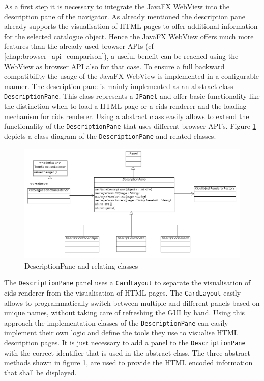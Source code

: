 As a first step it is necessary to integrate the JavaFX WebView into the description pane of the navigator.
As already mentioned the description pane already supports the visualisation of HTML pages to offer additional information for the selected catalogue object. 
Hence the JavaFX WebView offers much more features than the already used browser APIs (cf \ref{chap:browser_api_comparison}), a useful benefit can be reached using the WebView as browser API also for that case. 
To ensure a full backward compatibility the usage of the JavaFX WebView is implemented in a configurable manner. 
The description pane is mainly implemented as an abstract class \texttt{DescriptionPane}. 
This class represents a \texttt{JPanel} and offer basic functionality like the distinction when to load a HTML page or a cids renderer and the loading mechanism for cids renderer. 
Using a abstract class easily allows to extend the functionality of the \texttt{DescriptionPane} that uses different browser API's.  
Figure \ref{fig:class_diag_desc_pane} depicts a class diagram of the \texttt{DescriptionPane} and related classes.

\begin{figure}
	\centering	\includegraphics[width=1.0\textwidth]{./img/classDiagramms/description_pane.png}
	\caption{DescriptionPane and relating classes}
	\label{fig:class_diag_desc_pane}
\end{figure}

The \texttt{DescriptionPane} panel uses a \texttt{CardLayout} to separate the visualisation of cids renderer from the visualisation of HTML pages.
The \texttt{CardLayout} easily allows to programmatically switch between multiple and different panels based on unique names, without taking care of refreshing the GUI by hand.
Using this approach the implementation classes of the \texttt{DescriptionPane} can easily implement their own logic and define the tools they use to visualise HTML description pages.
It is just necessary to add a panel to the \texttt{DescriptionPane} with the correct identifier that is used in the abstract class.
The three abstract methods shown in figure \ref{fig:class_diag_desc_pane}, are used to provide the HTML encoded information that shall be displayed.

